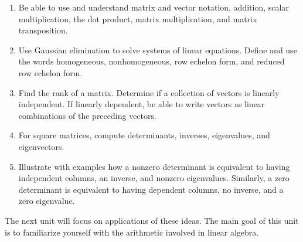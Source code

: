 
\begin{enumerate}

\item Be able to use and understand matrix and vector notation, addition, scalar multiplication, the dot product, matrix multiplication, and matrix transposition. 
\item Use Gaussian elimination to solve systems of linear equations. Define and use the words homogeneous, nonhomogeneous, row echelon form, and reduced row echelon form. 
\item Find the rank of a matrix. Determine if a collection of vectors is linearly independent. If linearly dependent, be able to write vectors as linear combinations of the preceding vectors.
\item For square matrices, compute determinants, inverses, eigenvalues, and eigenvectors. 
\item Illustrate with examples how a nonzero determinant is equivalent to having independent columns, an inverse, and nonzero eigenvalues. Similarly, a zero determinant is equivalent to having dependent columns, no inverse, and a zero eigenvalue. 

\end{enumerate}

The next unit will focus on applications of these ideas. The main goal of this unit is to familiarize yourself with the arithmetic involved in linear algebra.
